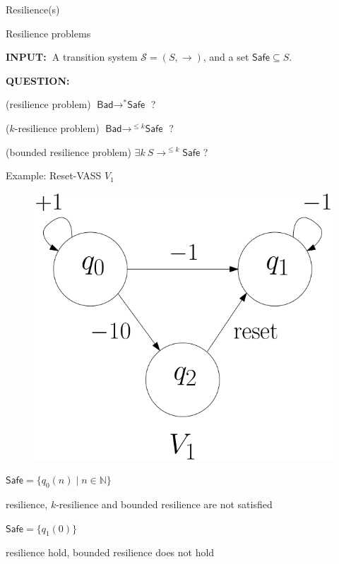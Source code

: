 \documentclass{beamer}
\newcommand{\N}{\mathbb{N}}
\newcommand{\Bad}{\textsf{Bad}}
\newcommand{\Safe}{\textsf{Safe}}
\begin{document}
  \begin{frame}{Resilience(s)}
  



  
 {\small
  
  
{\sc Resilience problems} 

\hspace{-0.5cm}  {\bf INPUT:\ }{A transition system $\mathscr{S}=(S,\rightarrow)$, and a set $\Safe \subseteq S$.}

\hspace{-0.5cm}  {\bf QUESTION:\ } 

\hspace{-0.5cm}  ({\sc resilience problem}) $\Bad \rightarrow^{*} \Safe$ ?

\hspace{-0.5cm}  ({\sc $k$-resilience problem})		$\Bad \rightarrow^{\leq k} \Safe$ ?

\hspace{-0.5cm}  ({\sc bounded resilience problem})	$\exists k ~ S \rightarrow^{\leq k} \Safe$ ?\newline

}

  \end{frame}
  \begin{frame}{Example: Reset-VASS $V_1$}
  
  
   \begin{center}
 	\begin{figure}
 	\vspace{.06cm}
\includegraphics[width=.50\textwidth]{FigA}
	\end{figure}
\end{center}  

$\Safe = \{q_0(n) \mid n \in \N\}$

{resilience}, 
{$k$-resilience} and {bounded resilience} are not satisfied


$\Safe = \{q_1(0)\} $

 {resilience} hold, {bounded resilience} does not hold

  \end{frame}
\end{document}
